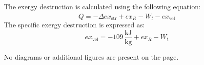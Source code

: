 The exergy destruction is calculated using the following equation:  
\[
\dot{Q} = -\Delta ex_{\text{str}} + ex_{R} - \dot{W}_t - ex_{\text{vel}}
\]  
The specific exergy destruction is expressed as:  
\[
ex_{\text{vel}} = -109 \, \frac{\text{kJ}}{\text{kg}} + ex_{R} - \dot{W}_t
\]  

No diagrams or additional figures are present on the page.